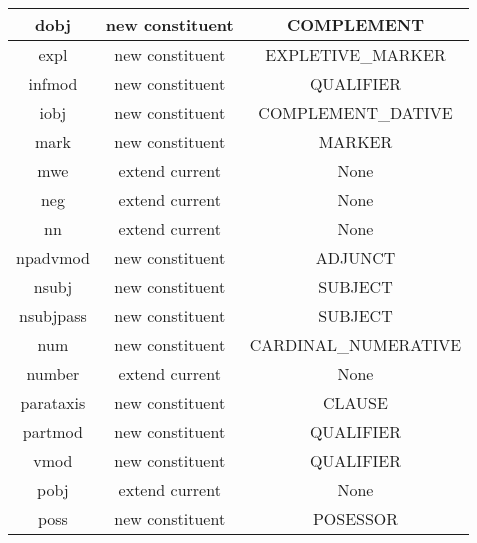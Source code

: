 \begin{table}[!ht]
{\begin{tabular}{|c|c|c|}
            dobj                  & new constituent             & COMPLEMENT                       \\ \hline
            expl                  & new constituent             & EXPLETIVE\_MARKER                \\ \hline
            infmod                & new constituent             & QUALIFIER                        \\ \hline
            iobj                  & new constituent             & COMPLEMENT\_DATIVE               \\ \hline
            mark                  & new constituent             & MARKER                           \\ \hline
            mwe                   & extend current              & None                             \\ \hline
            neg                   & extend current              & None                             \\ \hline
            nn                    & extend current              & None                             \\ \hline
            npadvmod              & new constituent             & ADJUNCT                          \\ \hline
            nsubj                 & new constituent             & SUBJECT                          \\ \hline
            nsubjpass             & new constituent             & SUBJECT                          \\ \hline
            num                   & new constituent             & CARDINAL\_NUMERATIVE             \\ \hline
            number                & extend current              & None                             \\ \hline
            parataxis             & new constituent             & CLAUSE                           \\ \hline
            partmod               & new constituent             & QUALIFIER                        \\ \hline
            vmod                  & new constituent             & QUALIFIER                        \\ \hline
            pobj                  & extend current              & None                             \\ \hline
            poss                  & new constituent             & POSESSOR                         \\ \hline

\end{tabular}}
\end{table}
